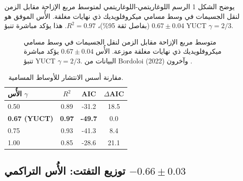 \documentclass[11pt,a4paper]{article}
\begin{document}
	يوضح الشكل 1 الرسم اللوغاريتمي-اللوغاريتمي لمتوسط مربع الإزاحة مقابل الزمن لنقل الجسيمات في وسط مسامي ميكروفلويديك ذي نهايات مغلقة. الأُس الموفق هو \(0.67 \pm 0.04\) (بفاصل ثقة 95\%)، \(R^2 = 0.97\). هذا يؤكد مباشرة تنبؤ YUCT \(\gamma = 2/3\).
	
	\begin{otherlanguage}{english}
		\begin{figure}[htbp]
			\centering
			\caption{متوسط مربع الإزاحة مقابل الزمن لنقل الجسيمات في وسط مسامي ميكروفلويديك ذي نهايات مغلقة موزعة. الأُس \(0.67 \pm 0.04\) يؤكد مباشرة تنبؤ YUCT \(\gamma = 2/3\). البيانات من Bordoloi وآخرون (2022) \cite{Bordoloi2022}.}
			\label{fig:diffusion}
		\end{figure}
		
		\begin{table}[htbp]
			\centering
			\caption{مقارنة أُسس الانتشار للأوساط المسامية.}
			\label{tab:diffusion}
			\begin{tabular}{lccc}
				\toprule
				الأُس \(\gamma\) & \(R^2\) & AIC & \(\Delta\)AIC \\
				\midrule
				0.50 & 0.89 & -31.2 & 18.5 \\
				\textbf{0.67 (YUCT)} & \textbf{0.97} & \textbf{-49.7} & 0.0 \\
				0.75 & 0.93 & -41.3 & 8.4 \\
				1.00 & 0.85 & -28.6 & 21.1 \\
				\bottomrule
			\end{tabular}
		\end{table}
	\end{otherlanguage}
	
	\subsection{توزيع التفتت: الأُس التراكمي \(-0.66 \pm 0.03\)}
	
\end{document}
